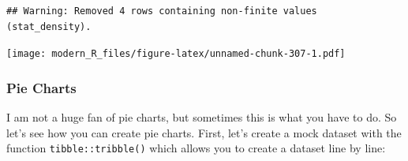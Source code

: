 \documentclass[]{gitbook}
\newenvironment{Shaded}{\begin{snugshade}}{\end{snugshade}}
\newcommand{\DataTypeTok}[1]{\textcolor[rgb]{0.13,0.29,0.53}{#1}}
\newcommand{\DecValTok}[1]{\textcolor[rgb]{0.00,0.00,0.81}{#1}}
\newcommand{\KeywordTok}[1]{\textcolor[rgb]{0.13,0.29,0.53}{\textbf{#1}}}
\newcommand{\NormalTok}[1]{#1}
\newcommand{\OperatorTok}[1]{\textcolor[rgb]{0.81,0.36,0.00}{\textbf{#1}}}
\newcommand{\StringTok}[1]{\textcolor[rgb]{0.31,0.60,0.02}{#1}}
\theoremstyle{definition}
\theoremstyle{definition}
\theoremstyle{definition}
\theoremstyle{remark}
\begin{document}
\begin{Shaded}
\end{Shaded}

\begin{verbatim}
## Warning: Removed 4 rows containing non-finite values (stat_density).
\end{verbatim}

\texttt{[image: modern\_R\_files/figure-latex/unnamed-chunk-307-1.pdf]}

\hypertarget{pie-charts}{%
\subsubsection{Pie Charts}\label{pie-charts}}

I am not a huge fan of pie charts, but sometimes this is what you have
to do. So let's see how you can create pie charts. First, let's create a
mock dataset with the function \texttt{tibble::tribble()} which allows
you to create a dataset line by line:
\end{document}
